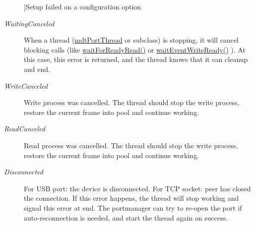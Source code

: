 \begin{Desc}
\begin{description}
{}]Setup failed on a configuration option \item[{\em 
\hypertarget{classmdt_abstract_port_ad4121bb930c95887e77f8bafa065a85ea14c0ddb478968710cb057a70406e4888}{
WaitingCanceled}
\label{classmdt_abstract_port_ad4121bb930c95887e77f8bafa065a85ea14c0ddb478968710cb057a70406e4888}
}]When a thread (\hyperlink{classmdt_port_thread}{mdtPortThread} or subclass) is stopping, it will cancel blocking calls (like \hyperlink{classmdt_abstract_port_aeda364cb191da1038a22dd1fc06a1d49}{waitForReadyRead()} or \hyperlink{classmdt_abstract_port_a35e4686f50e2c53c7e3618cf2c485d92}{waitEventWriteReady()} ). At this case, this error is returned, and the thread knows that it can cleanup and end. \item[{\em 
\hypertarget{classmdt_abstract_port_ad4121bb930c95887e77f8bafa065a85eae50ff4a9393507ad39005ddc7d5be42f}{
WriteCanceled}
\label{classmdt_abstract_port_ad4121bb930c95887e77f8bafa065a85eae50ff4a9393507ad39005ddc7d5be42f}
}]Write process was cancelled. The thread should stop the write process, restore the current frame into pool and continue working. \item[{\em 
\hypertarget{classmdt_abstract_port_ad4121bb930c95887e77f8bafa065a85eac910ca649b9eaa64e290be41945a61dc}{
ReadCanceled}
\label{classmdt_abstract_port_ad4121bb930c95887e77f8bafa065a85eac910ca649b9eaa64e290be41945a61dc}
}]Read process was cancelled. The thread should stop the write process, restore the current frame into pool and continue working. \item[{\em 
\hypertarget{classmdt_abstract_port_ad4121bb930c95887e77f8bafa065a85ea8b70726d03f75a691ac4ad65722a5f3c}{
Disconnected}
\label{classmdt_abstract_port_ad4121bb930c95887e77f8bafa065a85ea8b70726d03f75a691ac4ad65722a5f3c}
}]For USB port: the device is disconnected. For TCP socket: peer has closed the connection. If this error happens, the thread will stop working and signal this error at end. The portmanager can try to re-\/open the port if auto-\/reconnection is needed, and start the thread again on success.\begin{Desc}

\end{Desc}
\end{description}
\end{Desc}
